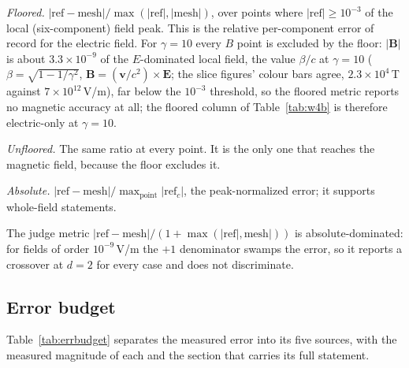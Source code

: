 \emph{Floored.}
$|\mathrm{ref}-\mathrm{mesh}|/\max(|\mathrm{ref}|,|\mathrm{mesh}|)$, over
points where $|\mathrm{ref}|\ge10^{-3}$ of the local (six-component) field
peak. This is the relative per-component error of record for the electric
field. For $\gamma=10$ every $B$ point is excluded by the floor:
$|\mathbf{B}|$ is about $3.3\!\times\!10^{-9}$ of the $E$-dominated local
field, the value $\beta/c$ at $\gamma=10$ ($\beta=\sqrt{1-1/\gamma^{2}}$,
$\boldsymbol{B}=(\boldsymbol{v}/c^{2})\times\boldsymbol{E}$; the slice
figures' colour bars agree, $2.3\!\times\!10^{4}$\,T against
$7\!\times\!10^{12}$\,V/m), far below the $10^{-3}$ threshold, so the
floored metric reports no magnetic
accuracy at all; the floored column of Table~\ref{tab:w4b} is therefore
electric-only at $\gamma=10$.

\emph{Unfloored.} The same ratio at every point. It is the only one that
reaches the magnetic field, because the floor excludes it.

\emph{Absolute.}
$|\mathrm{ref}-\mathrm{mesh}|/\max_{\mathrm{point}}|\mathrm{ref}_c|$, the
peak-normalized error; it supports whole-field statements.

The judge metric
$|\mathrm{ref}-\mathrm{mesh}|/(1+\max(|\mathrm{ref}|,\mathrm{mesh}|))$ is
absolute-dominated: for fields of order $10^{-9}$\,V/m the $+1$ denominator
swamps the error, so it reports a crossover at $d=2$ for every case and does
not discriminate.

\subsection{Error budget}
\label{sec:errbudget}

Table~\ref{tab:errbudget} separates the measured error into its five
sources, with the measured magnitude of each and the section that carries
its full statement.

